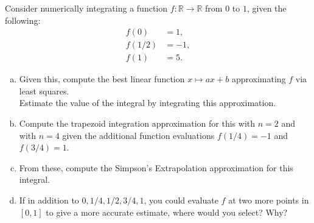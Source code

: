 \documentclass[11pt]{article}
\newenvironment{problem}[2][Question]{\begin{trivlist}
\item[\hskip \labelsep {\bfseries #1}\hskip \labelsep {\bfseries #2.}]}{\end{trivlist}}
\theoremstyle{definition}
\begin{document}
\begin{problem}{Q2}
Consider numerically integrating a function $f\colon \mathbb{R}\rightarrow \mathbb{R}$ from $0$ to $1$, given the following:
\begin{align*}
    f(0) &= 1,\\
    f(1/2) &= -1,\\
    f(1) &= 5.    
\end{align*}
\begin{enumerate}[(a)]
\item Given this, compute the best linear function $x\mapsto ax+b$ approximating $f$ via least squares.\\
Estimate the value of the integral by integrating this approximation.
\item Compute the trapezoid integration approximation for this with $n=2$ and with $n=4$ given the additional function evaluations $f(1/4) = -1$ and $f(3/4) = 1$.
\item From these, compute the Simpson's Extrapolation approximation for this integral.
\item If in addition to $0,1/4,1/2,3/4,1$, you could evaluate $f$ at two more points in $[0,1]$ to give a more accurate estimate, where would you select? Why?
\end{enumerate}
\end{problem}
\end{document}
